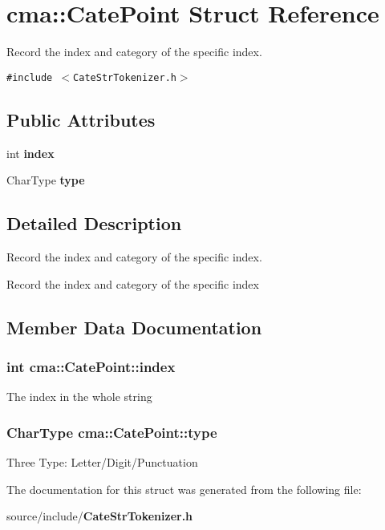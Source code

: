 \section{cma::CatePoint Struct Reference}
\label{structcma_1_1CatePoint}
Record the index and category of the specific index.  


{\tt \#include $<$CateStrTokenizer.h$>$}

\subsection*{Public Attributes}
\begin{CompactItemize}
\item 
int {\bf index}
\item 
CharType {\bf type}
\end{CompactItemize}


\subsection{Detailed Description}
Record the index and category of the specific index. 

Record the index and category of the specific index 

\subsection{Member Data Documentation}
\subsubsection{\setlength{\rightskip}{0pt plus 5cm}int {\bf cma::CatePoint::index}}\label{structcma_1_1CatePoint_4d5fb8b0c7028e57ef179c0630f0eee7}


The index in the whole string 
\subsubsection{\setlength{\rightskip}{0pt plus 5cm}CharType {\bf cma::CatePoint::type}}\label{structcma_1_1CatePoint_1eddb8c6760d5cd21d5f15b1ee8eb01f}


Three Type: Letter/Digit/Punctuation 

The documentation for this struct was generated from the following file:\begin{CompactItemize}
\item 
source/include/{\bf CateStrTokenizer.h}\end{CompactItemize}
